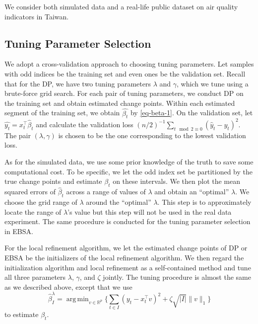 \documentclass[twoside]{article}
\DeclareMathOperator*{\argmin}{arg\,min}
\begin{document}
We consider both simulated data and a real-life public dataset on air quality indicators in Taiwan. 

\subsection{Tuning Parameter Selection}
We adopt a cross-validation approach to choosing tuning parameters.  Let samples with odd indices be the training set and even ones be the validation set.  Recall that for the DP, we have two tuning parameters $\lambda$ and $\gamma$, which we tune using a brute-force grid search.  For each pair of tuning parameters, we conduct DP on the training set and obtain estimated change points.  Within each estimated segment of the training set, we obtain $\hat{\beta_t}$ by \eqref{eq-beta-1}.  On the validation set, let $\hat{y_t} = x_t^{\top} \hat{\beta}_t$ and calculate the validation loss $(n/2)^{-1} \sum_{t \mod 2 \equiv 0}(\hat{y}_t - y_t)^2$.  The pair $(\lambda, \gamma)$ is chosen to be the one corresponding to the lowest validation loss. 

As for the simulated data, we use some prior knowledge of the truth to save some computational cost.  To be specific, we let the odd index set be partitioned by the true change points and estimate $\beta_t$ on these intervals.  We then plot the mean squared errors of $\hat{\beta}_t$ across a range of values of $\lambda$ and obtain an ``optimal'' $\lambda$.  We choose the grid range of $\lambda$ around the ``optimal'' $\lambda$.  This step is to approximately locate the range of $\lambda$'s value but this step will not be used in the real data experiment.  The same procedure is conducted for the tuning parameter selection in EBSA.

For the local refinement algorithm, we let the estimated change points of DP or EBSA be the initializers of the local refinement algorithm.  We then regard the initialization algorithm and local refinement as a self-contained method and tune all three parameters $\lambda$, $\gamma$, and $\zeta$ jointly.  The tuning procedure is almost the same as we described above, except that we use 
    \[
		\widehat \beta^\lambda_I = \argmin_{v \in \mathbb R^p} \bigg\{\sum_{t \in I} (y_t - x_t^{\top}v)^2  	+ \zeta \sqrt{|I|} \| v\|_1\bigg\} 
	\]
    to estimate $\beta_t$. %
\end{document}
